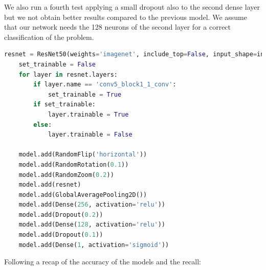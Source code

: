 We also run a fourth test applying a small dropout also to the second dense layer but we not obtain better results compared to the previous model. We assume that our network needs the 128 neurons of the second layer for a correct classification of the problem.
\begin{lstlisting}[language=python, caption={ResNet50, fourth model code}, label={lst:resnet50CodeFourthTest}]
    resnet = ResNet50(weights='imagenet', include_top=False, input_shape=input_shape)
    set_trainable = False
    for layer in resnet.layers:
        if layer.name == 'conv5_block1_1_conv':
            set_trainable = True
        if set_trainable:
            layer.trainable = True
        else:
            layer.trainable = False

    model.add(RandomFlip('horizontal'))
    model.add(RandomRotation(0.1))
    model.add(RandomZoom(0.2))
    model.add(resnet)
    model.add(GlobalAveragePooling2D())
    model.add(Dense(256, activation='relu'))
    model.add(Dropout(0.2))
    model.add(Dense(128, activation='relu'))
    model.add(Dropout(0.1))
    model.add(Dense(1, activation='sigmoid'))
\end{lstlisting}

Following a recap of the accuracy of the models and the recall:

\begin{table}[!h]
    \centering
    \caption{ResNet50 accuracy and recall}
    \label{tab:ResNet50}
    \end{table}

